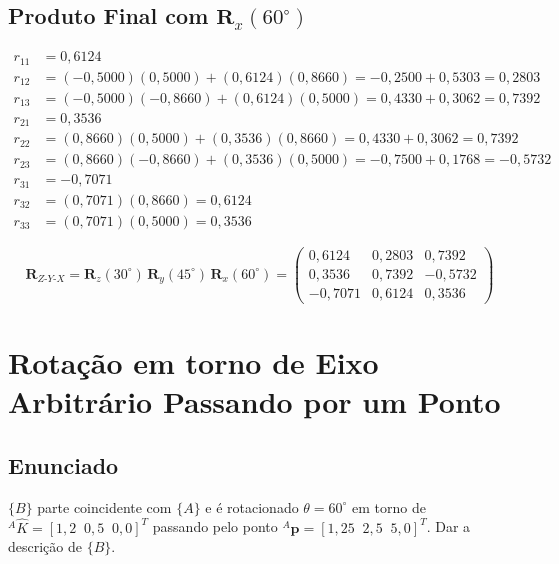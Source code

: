 \documentclass[12pt,a4paper]{article}
\newcommand{\Rx}[1]{\mathbf{R}_x(#1)}
\newcommand{\Ry}[1]{\mathbf{R}_y(#1)}
\newcommand{\Rz}[1]{\mathbf{R}_z(#1)}
\newcommand{\degr}{^{\circ}}
\begin{document}
\subsection{Produto Final com $\Rx{60\degr}$}

\begin{align*}
  r_{11} &= 0{,}6124 \\
  r_{12} &= (-0{,}5000)(0{,}5000) + (0{,}6124)(0{,}8660) = -0{,}2500 + 0{,}5303 = 0{,}2803 \\
  r_{13} &= (-0{,}5000)(-0{,}8660) + (0{,}6124)(0{,}5000) = 0{,}4330 + 0{,}3062 = 0{,}7392 \\
  r_{21} &= 0{,}3536 \\
  r_{22} &= (0{,}8660)(0{,}5000) + (0{,}3536)(0{,}8660) = 0{,}4330 + 0{,}3062 = 0{,}7392 \\
  r_{23} &= (0{,}8660)(-0{,}8660) + (0{,}3536)(0{,}5000) = -0{,}7500 + 0{,}1768 = -0{,}5732 \\
  r_{31} &= -0{,}7071 \\
  r_{32} &= (0{,}7071)(0{,}8660) = 0{,}6124 \\
  r_{33} &= (0{,}7071)(0{,}5000) = 0{,}3536
\end{align*}

\begin{tcolorbox}[resultbox]
\[
\mathbf{R}_{Z\text{-}Y\text{-}X} = \Rz{30\degr}\,\Ry{45\degr}\,\Rx{60\degr} =
\begin{pmatrix}
  0{,}6124 &  0{,}2803 &  0{,}7392 \\
  0{,}3536 &  0{,}7392 & -0{,}5732 \\
 -0{,}7071 &  0{,}6124 &  0{,}3536
\end{pmatrix}
\]
\end{tcolorbox}

\newpage

\section{Rotação em torno de Eixo Arbitrário Passando por um Ponto}

\subsection*{Enunciado}
$\{B\}$ parte coincidente com $\{A\}$ e é rotacionado $\theta=60\degr$ em torno de
${}^{A}\hat{K} = [1{,}2\;\;0{,}5\;\;0{,}0]^T$ passando pelo ponto ${}^{A}\mathbf{p} = [1{,}25\;\;2{,}5\;\;5{,}0]^T$.
Dar a descrição de $\{B\}$.
\end{document}
